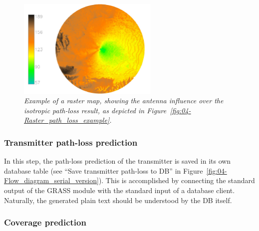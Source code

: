 \begin{figure}[h]
\centering

\includegraphics[width=0.6\textwidth]{04-framework_design_and_implementation/img/antenna_calculation}

\caption{\textit{\emph{Example of a raster map, showing the antenna influence
over the isotropic path-loss result, as depicted in Figure~\ref{fig:04-Raster_path_loss_example}.\label{fig:04-Raster_antenna_example}}}}
\end{figure}



\subsubsection{Transmitter path-loss prediction \label{sub:04-Transmitter_path_loss_prediction}}

In this step, the path-loss prediction of the transmitter is saved
in its own database table (see ``Save transmitter path-loss to DB''
in Figure~\ref{fig:04-Flow_diagram_serial_version}). This is accomplished
by connecting the standard output of the GRASS module with the standard
input of a database client. Naturally, the generated plain text should
be understood by the DB itself.


\subsubsection{Coverage prediction \label{sub:04-Coverage_prediction}}


